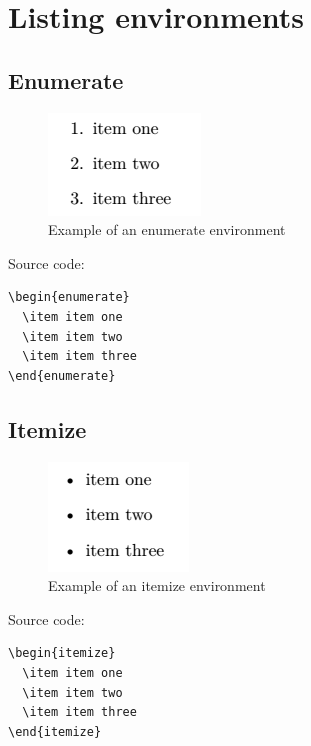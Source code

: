\section{Listing environments}

\subsection{Enumerate}

\begin{figure}[H]
\centering
\includegraphics[scale=0.8]{content/LaTeX/figures/enumerate_outcome_example.png}
\caption{Example of an enumerate environment}
\label{fig:enumerate_outcome_example}
\end{figure}

Source code:

\begin{Verbatim}
\begin{enumerate}
  \item item one
  \item item two
  \item item three
\end{enumerate} 
\end{Verbatim}

\subsection{Itemize}

\begin{figure}[H]
\centering
\includegraphics[scale=0.8]{content/LaTeX/figures/itemize_outcome_example.png}
\caption{Example of an itemize environment}
\label{fig:itemize_outcome_example}
\end{figure}

Source code:

\begin{Verbatim}
\begin{itemize}
  \item item one
  \item item two
  \item item three
\end{itemize} 
\end{Verbatim}

